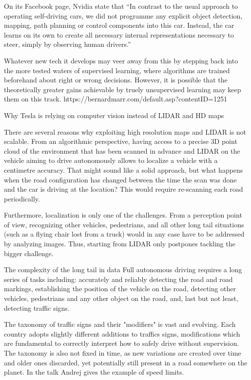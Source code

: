 On its Facebook page, Nvidia state that “In contrast to the usual approach to operating self-driving cars, we did not  programme any explicit object detection, mapping, path planning or control components into this car. Instead, the car learns on its own to create all necessary internal representations necessary to steer, simply by observing human drivers.”

Whatever new tech it develops may veer away from this by stepping back into the more tested waters of supervised learning, where algorithms are trained beforehand about right or wrong decisions. However, it is possible that the theoretically greater gains achievable by truely unsupervised learning may keep them on this track.
https://bernardmarr.com/default.asp?contentID=1251

Why Tesla is relying on computer vision instead of LIDAR and HD maps

There are several reasons why exploiting high resolution maps and LIDAR is not scalable. From an algorithmic perspective, having access to a precise 3D point cloud of the environment that has been scanned in advance and LIDAR on the vehicle aiming to drive autonomously allows to localize a vehicle with a centimetre accuracy. That might sound like a solid approach, but what happens when the road configuration has changed between the time the scan was done and the car is driving at the location? This would require re-scanning each road periodically.

Furthermore, localization is only one of the challenges. From a perception point of view, recognizing other vehicles, pedestrians, and all other long tail situations (such as a flying chair lost from a truck) would in any case have to be addressed by analyzing images. Thus, starting from LIDAR only postpones tackling the bigger challenge.


The complexity of the long tail in data
Full autonomous driving requires a long series of tasks including: accurately and reliably detecting the road and road markings, establishing the position of the vehicle on the road, detecting other vehicles, pedestrians and any other object on the road, and, last but not least, detecting traffic signs.

The taxonomy of traffic signs and their "modifiers" is vast and evolving. Each country adopts slightly different additions to traffics signs, modifications which are fundamental to correctly interpret how to safely drive without supervision. The taxonomy is also not fixed in time, as new variations are created over time and older ones discarded, yet potentially still present in a road somewhere on the planet. In the talk Andrej gives the example of speed limits.

